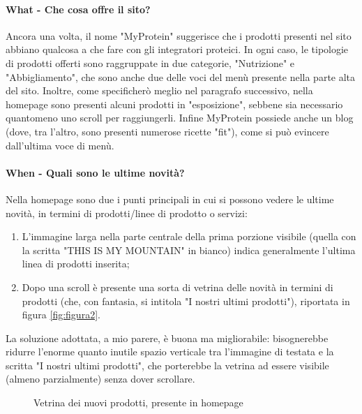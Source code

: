 \paragraph{What - Che cosa offre il sito?}
Ancora una volta, il nome "MyProtein" suggerisce che i prodotti presenti nel sito abbiano qualcosa a che fare con gli integratori proteici. In ogni caso, le tipologie di prodotti offerti sono raggruppate in due categorie, "Nutrizione" e "Abbigliamento", che sono anche due delle voci del menù presente nella parte alta del sito. Inoltre, come specificherò meglio nel paragrafo successivo, nella homepage sono presenti alcuni prodotti in "esposizione", sebbene sia necessario quantomeno uno scroll per raggiungerli. Infine MyProtein possiede anche un blog (dove, tra l'altro, sono presenti numerose ricette "fit"), come si può evincere dall'ultima voce di menù.
\paragraph{When - Quali sono le ultime novità?}
Nella homepage sono due i punti principali in cui si possono vedere le ultime novità, in termini di prodotti/linee di prodotto o servizi:
\begin{enumerate}
	\item L'immagine larga nella parte centrale della prima porzione visibile (quella con la scritta "THIS IS MY MOUNTAIN" in bianco) indica generalmente l'ultima linea di prodotti inserita;
	\item Dopo una scroll è presente una sorta di vetrina delle novità in termini di prodotti (che, con fantasia, si intitola "I nostri ultimi prodotti"), riportata in figura \ref{fig:figura2}.
\end{enumerate}
La soluzione adottata, a mio parere, è buona ma migliorabile: bisognerebbe ridurre l'enorme quanto inutile spazio verticale tra l'immagine di testata e la scritta "I nostri ultimi prodotti", che porterebbe la vetrina ad essere visibile (almeno parzialmente) senza dover scrollare.

\begin{figure}[!htb]
	\caption{\label{fig:figura3} Vetrina dei nuovi prodotti, presente in homepage}
\end{figure}
